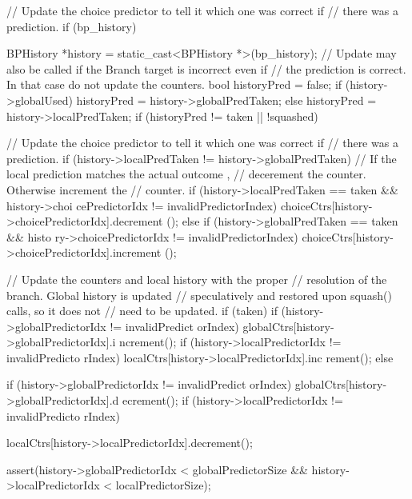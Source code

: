 \begin{DoxyCode}
{
    // Update the choice predictor to tell it which one was correct if
    // there was a prediction.
    if (bp_history) {
        BPHistory *history = static_cast<BPHistory *>(bp_history);
        // Update may also be called if the Branch target is incorrect even if
        // the prediction is correct. In that case do not update the counters.
        bool historyPred = false;
        if (history->globalUsed) {
           historyPred = history->globalPredTaken;
        } else {
           historyPred = history->localPredTaken;
        }
        if (historyPred != taken || !squashed) {
            // Update the choice predictor to tell it which one was correct if
            // there was a prediction.
                        if (history->localPredTaken != history->globalPredTaken) 
      {
                            // If the local prediction matches the actual outcome
      ,
                            // decerement the counter.  Otherwise increment the
                            // counter.
                            if (history->localPredTaken == taken && history->choi
      cePredictorIdx != invalidPredictorIndex) {
                                choiceCtrs[history->choicePredictorIdx].decrement
      ();
                            } else if (history->globalPredTaken == taken && histo
      ry->choicePredictorIdx != invalidPredictorIndex) {
                                choiceCtrs[history->choicePredictorIdx].increment
      ();
                            }
                        }
                        
                        // Update the counters and local history with the proper
                        // resolution of the branch.  Global history is updated
                        // speculatively and restored upon squash() calls, so it 
      does not
                        // need to be updated.
                        if (taken) {
                                if (history->globalPredictorIdx != invalidPredict
      orIndex) {
                                        globalCtrs[history->globalPredictorIdx].i
      ncrement();
                                }
                                if (history->localPredictorIdx != invalidPredicto
      rIndex) {
                                        localCtrs[history->localPredictorIdx].inc
      rement();
                                }
                        } else {
                                if (history->globalPredictorIdx != invalidPredict
      orIndex) {
                                        globalCtrs[history->globalPredictorIdx].d
      ecrement();
                                }
                                if (history->localPredictorIdx != invalidPredicto
      rIndex) {
                               localCtrs[history->localPredictorIdx].decrement();
      
                                }
                        }
                        assert(history->globalPredictorIdx < globalPredictorSize 
      &&
                               history->localPredictorIdx < localPredictorSize);
                }
    }
}
\end{DoxyCode}
